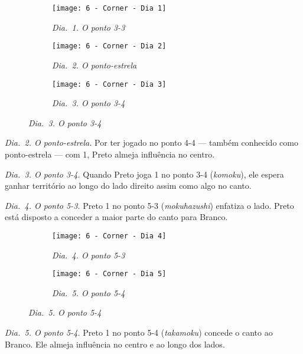 \begin{figure}[h!]
    \centering
    \begin{subfigure}[t]{.3\textwidth}
        \centering
        \texttt{[image: 6 - Corner - Dia 1]}
        \captionsetup{justification=centering}
        \caption*{\emph{Dia.\@~1. O ponto 3-3}}
    \end{subfigure}
    \hfill
    \begin{subfigure}[t]{.3\textwidth}
        \centering
        \texttt{[image: 6 - Corner - Dia 2]}
        \captionsetup{justification=centering}
        \caption*{\emph{Dia.\@~2. O ponto-estrela}}
    \end{subfigure}
    \hfill
    \begin{subfigure}[t]{.3\textwidth}
        \centering
        \texttt{[image: 6 - Corner - Dia 3]}
        \captionsetup{justification=centering}
        \caption*{\emph{Dia.\@~3. O ponto 3-4}}
    \end{subfigure}
\end{figure}

\emph{Dia.\@~2. O ponto-estrela.} Por ter jogado no ponto 4-4 --- também conhecido como ponto-estrela --- com 1, Preto almeja influência no centro.

\emph{Dia.\@~3. O ponto 3-4.} Quando Preto joga 1 no ponto 3-4 (\emph{komoku}), ele espera ganhar território ao longo do lado direito assim como algo no canto.

\emph{Dia.\@~4. O ponto 5-3.} Preto 1 no ponto 5-3 (\emph{mokuhazushi}) enfatiza o lado. Preto está disposto a conceder a maior parte do canto para Branco.


\begin{figure}[h!]
    \centering
    \begin{subfigure}[t]{.3\textwidth}
        \centering
        \texttt{[image: 6 - Corner - Dia 4]}
        \captionsetup{justification=centering}
        \caption*{\emph{Dia.\@~4. O ponto 5-3}}
    \end{subfigure}
    \hspace{1cm}
    \begin{subfigure}[t]{.3\textwidth}
        \centering
        \texttt{[image: 6 - Corner - Dia 5]}
        \captionsetup{justification=centering}
        \caption*{\emph{Dia.\@~5. O ponto 5-4}}
    \end{subfigure}
\end{figure}

\emph{Dia.\@~5. O ponto 5-4.} Preto 1 no ponto 5-4 (\emph{takamoku}) concede o canto ao Branco. Ele almeja influência no centro e ao longo dos lados.

